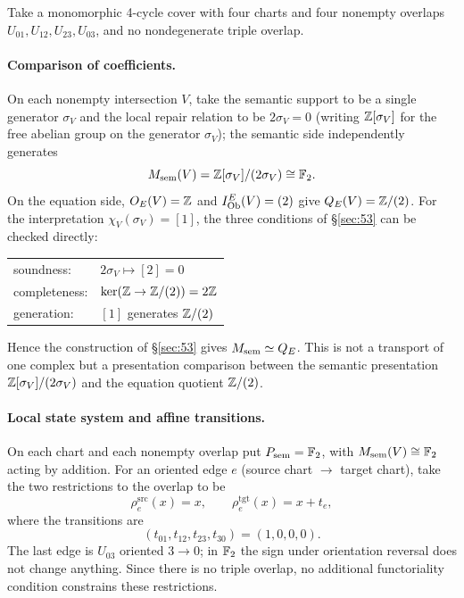 \begin{example}\label{ex:circle}
Take a monomorphic 4-cycle cover with four charts and four nonempty
overlaps $U_{01}, U_{12}, U_{23}, U_{03}$, and no nondegenerate triple
overlap.

\paragraph{Comparison of coefficients.}
On each nonempty intersection $V$, take the semantic support to be a
single generator $\sigma_V$ and the local repair relation to be
$2\sigma_V=0$ (writing $\mathbb{Z}[\sigma_V]$ for the free abelian group on
the generator $\sigma_V$); the semantic side independently generates
\[
M_{\mathrm{sem}}(V)=\mathbb{Z}[\sigma_V]/(2\sigma_V)\cong\mathbb{F}_{2}.
\]
On the equation side, $O_{E}(V)=\mathbb{Z}$ and $I_{\mathrm{Ob}}^{E}(V)=(2)$ give
$Q_{E}(V)=\mathbb{Z}/(2)$. For the interpretation $\chi_V(\sigma_V)=[1]$,
the three conditions of \S\ref{sec:53} can be checked directly:
\begin{center}
\small
\begin{tabular}{ll}
soundness: & $2\sigma_V \mapsto [2] = 0$\\
completeness: & $\ker(\mathbb{Z} \to \mathbb{Z}/(2)) = 2\mathbb{Z}$\\
generation: & $[1]$ generates $\mathbb{Z}/(2)$\\
\end{tabular}
\end{center}
Hence the construction of \S\ref{sec:53} gives $M_{\mathrm{sem}}\simeq Q_{E}$.
This is not a transport of one complex but a presentation comparison
between the semantic presentation $\mathbb{Z}[\sigma_V]/(2\sigma_V)$ and the
equation quotient $\mathbb{Z}/(2)$.

\paragraph{Local state system and affine transitions.}
On each chart and each nonempty overlap put $P_{\mathrm{sem}}=\mathbb{F}_{2}$, with
$M_{\mathrm{sem}}(V)\cong\mathbb{F}_{2}$ acting by addition. For an oriented edge $e$
(source chart $\to$ target chart), take the two restrictions to the
overlap to be
\[
\rho^{\mathrm{src}}_e(x)=x,
\qquad
\rho^{\mathrm{tgt}}_e(x)=x+t_e,
\]
where the transitions are
\[
(t_{01},t_{12},t_{23},t_{30})=(1,0,0,0).
\]
The last edge is $U_{03}$ oriented $3\to0$; in $\mathbb{F}_{2}$ the sign under
orientation reversal does not change anything. Since there is no
triple overlap, no additional functoriality condition constrains
these restrictions.


\end{example}
